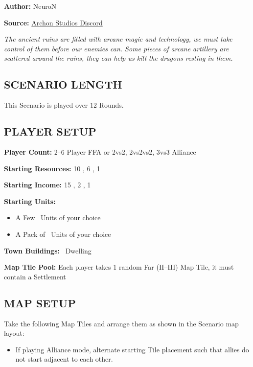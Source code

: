 
\begin{multicols}{2}

\textbf{Author:} NeuroN

\textbf{Source:} \href{https://discord.com/channels/740870068178649108/1279029213839626313}{Archon Studios Discord}

\textit{The ancient ruins are filled with arcane magic and technology, we must take control of them before our enemies can.
Some pieces of arcane artillery are scattered around the ruins, they can help us kill the dragons resting in them.}

\subsection*{\MakeUppercase{Scenario Length}}
This Scenario is played over 12 Rounds.

\subsection*{\MakeUppercase{Player Setup}}
\textbf{Player Count:} 2--6 Player FFA or 2vs2, 2vs2vs2, 3vs3 Alliance

\textbf{Starting Resources:} 10 , 6 , 1 

\textbf{Starting Income:} 15 , 2 , 1 

\textbf{Starting Units:}
\begin{itemize}
  \item A Few \bronze\ Units of your choice
  \item A Pack of \bronze\ Units of your choice
\end{itemize}

\textbf{Town Buildings:} \bronze\ Dwelling

\textbf{Map Tile Pool:} Each player takes 1 random Far (II--III) Map Tile, it must contain a Settlement

\subsection*{\MakeUppercase{Map Setup}}
Take the following Map Tiles and arrange them as shown in the Scenario map layout:

\begin{itemize}
  \item If playing Alliance mode, alternate starting Tile placement such that allies do not start adjacent to each other.
\end{itemize}


\end{multicols}
